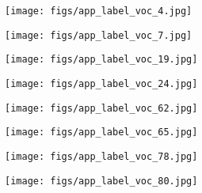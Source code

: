\documentclass[10pt,twocolumn,letterpaper]{article}
\begin{document}
\begin{figure}[!t]
    \begin{subfigure}{0.135\linewidth}
        \centering
        \texttt{[image: figs/app\_label\_voc\_4.jpg]}
\end{subfigure}
    \begin{subfigure}{0.135\linewidth}
        \centering
        \texttt{[image: figs/app\_label\_voc\_7.jpg]}
\end{subfigure}
    \begin{subfigure}{0.135\linewidth}
        \centering
        \texttt{[image: figs/app\_label\_voc\_19.jpg]}
\end{subfigure}
    \begin{subfigure}{0.135\linewidth}
        \centering
        \texttt{[image: figs/app\_label\_voc\_24.jpg]}
\end{subfigure}
    \begin{subfigure}{0.085\linewidth}
        \centering
        \texttt{[image: figs/app\_label\_voc\_62.jpg]}
\end{subfigure}
    \begin{subfigure}{0.085\linewidth}
        \centering
        \texttt{[image: figs/app\_label\_voc\_65.jpg]}
\end{subfigure}
    \begin{subfigure}{0.075\linewidth}
        \centering
        \texttt{[image: figs/app\_label\_voc\_78.jpg]}
\end{subfigure}
    \begin{subfigure}{0.135\linewidth}
        \centering
        \texttt{[image: figs/app\_label\_voc\_80.jpg]}
\end{subfigure}


\end{figure}
\end{document}
